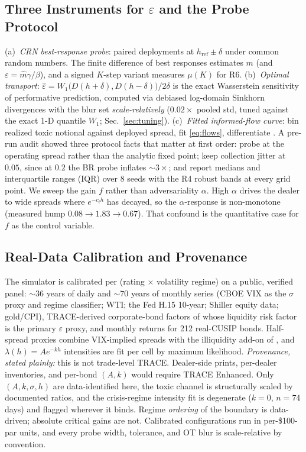 \documentclass[sigconf]{acmart}
\newcommand{\eps}{\varepsilon}
\newcommand{\hRef}{h_{\mathrm{ref}}}  %
\newcommand{\Wone}{W_1}
\begin{document}
\subsection{Three Instruments for $\eps$ and the Probe Protocol}
\label{sec:instruments}
(a)~\emph{CRN best-response probe}: paired deployments at $\hRef\pm\delta$
under common random numbers. The finite difference of best responses
estimates $m$ (and $\eps=\hat m\gamma/\beta$), and a signed $K$-step variant
measures $\mu(K)$ for R6. (b)~\emph{Optimal transport}:
$\hat\eps=\Wone\big(D(h{+}\delta),D(h{-}\delta)\big)/2\delta$ is the exact
Wasserstein sensitivity of performative prediction, computed via debiased
log-domain Sinkhorn divergences
\cite{cuturi2013sinkhorn,feydy2019interpolating} with the blur set
\emph{scale-relatively} ($0.02\times$ pooled std, tuned against the exact
1-D quantile $\Wone$; Sec.~\ref{sec:tuning}). (c)~\emph{Fitted
informed-flow curve}: bin realized toxic notional against deployed spread,
fit \eqref{eq:flows}, differentiate \cite{cont2014price}. A pre-run audit
showed three protocol facts that matter at first order: probe at the
operating spread rather than the analytic fixed point; keep collection
jitter at $0.05$, since at $0.2$ the BR probe inflates ${\sim}3\times$; and
report medians and interquartile ranges (IQR) over 8 seeds with the R4
robust bands at every grid point. We sweep the gain $f$ rather than
adversariality $\alpha$. High $\alpha$ drives the dealer to wide spreads
where $e^{-c_t h}$ has decayed, so the $\alpha$-response is non-monotone
(measured hump $0.08\to1.83\to0.67$). That confound is the quantitative case
for $f$ as the control variable.

\subsection{Real-Data Calibration and Provenance}
\label{sec:data}
The simulator is calibrated per (rating $\times$ volatility regime) on a
public, verified panel: ${\sim}36$ years of daily and ${\sim}70$ years of
monthly series (CBOE VIX as the $\sigma$ proxy and regime classifier; WTI;
the Fed H.15 10-year; Shiller equity data; gold/CPI), TRACE-derived
corporate-bond factors of \cite{dickerson2023priced} whose liquidity risk
factor is the primary $\eps$ proxy, and monthly returns for 212 real-CUSIP
bonds. Half-spread proxies combine VIX-implied spreads with the illiquidity
add-on of \cite{friewald2012illiquidity,bao2011illiquidity}, and
$\lambda(h)=Ae^{-kh}$ intensities are fit per cell by maximum likelihood.
\emph{Provenance, stated plainly:} this is not trade-level TRACE.
Dealer-side prints, per-dealer inventories, and per-bond $(A,k)$ would
require TRACE Enhanced. Only $(A,k,\sigma,h)$ are data-identified here, the
toxic channel is structurally scaled by documented ratios, and the
crisis-regime intensity fit is degenerate ($k=0$, $n=74$ days) and flagged
wherever it binds. Regime \emph{ordering} of the boundary is data-driven;
absolute critical gains are not. Calibrated configurations run in
per-\$100-par units, and every probe width, tolerance, and OT blur is
scale-relative by convention.
\end{document}
